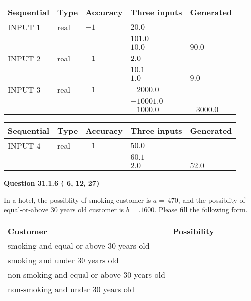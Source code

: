 \documentclass[12pt]{article}
\begin{document}
  
\noindent\begin{tabular}{|l|l|l|l|l|}
\hline
 Sequential & Type & Accuracy & Three inputs & Generated \\ 
\hline
 
 
  INPUT $           1$ & real & $          -1 $ & $
 20.0
  $ & \\
  & & &  $
 101.0
  $ & \\
  & & &  $
 10.0
 $ & $ 90.0 $ 
 \\  \hline  
 
 
  INPUT $           2$ & real & $          -1 $ & $
 2.0
  $ & \\
  & & &  $
 10.1
  $ & \\
  & & &  $
 1.0
 $ & $ 9.0 $ 
 \\  \hline  
 
 
  INPUT $           3$ & real & $          -1 $ & $
 -2000.0
  $ & \\
  & & &  $
 -10001.0
  $ & \\
  & & &  $
 -1000.0
 $ & $ -3000.0 $ 
 \\  \hline  
 \end{tabular}
   
   
  
  
\noindent\begin{tabular}{|l|l|l|l|l|}
\hline
 Sequential & Type & Accuracy & Three inputs & Generated \\ 
\hline
 
 
  INPUT $           4$ & real & $          -1 $ & $
 50.0
  $ & \\
  & & &  $
 60.1
  $ & \\
  & & &  $
 2.0
 $ & $ 52.0 $ 
 \\  \hline  
 \end{tabular}
   
   
  
\vspace{0.2in}
  
{\textbf{\Large{Question
31.1.6 
 (          6,         12,         27)
}}}
  
  
In a hotel, the possiblity of  %
smoking customer is
$a =  %
.470$, and the possiblity of  %
equal-or-above 30 years old customer is $ b =  %
.1600$.
Please fill the following form.
 
\noindent
\begin{tabular}{|l|l|}
\hline
Customer & Possibility \\
\hline
smoking  and   %
equal-or-above 30 years old  & \\
\hline
smoking  and   %
under 30 years old & \\
\hline
 non-smoking and   %
equal-or-above 30 years old  & \\
\hline
 non-smoking and  %
under 30 years old & \\
\hline
\end{tabular}
 
\end{document}
